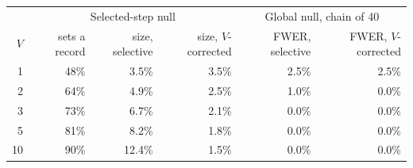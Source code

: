 \begin{tabular}{rrrrrr}
\toprule
 & \multicolumn{3}{c}{Selected-step null} & \multicolumn{2}{c}{Global null, chain of 40} \\
$V$ & sets a record & size, selective & size, $V$-corrected & FWER, selective & FWER, $V$-corrected \\
\midrule
1 & 48\% & 3.5\% & 3.5\% & 2.5\% & 2.5\% \\
2 & 64\% & 4.9\% & 2.5\% & 1.0\% & 0.0\% \\
3 & 73\% & 6.7\% & 2.1\% & 0.0\% & 0.0\% \\
5 & 81\% & 8.2\% & 1.8\% & 0.0\% & 0.0\% \\
10 & 90\% & 12.4\% & 1.5\% & 0.0\% & 0.0\% \\
\bottomrule
\end{tabular}
